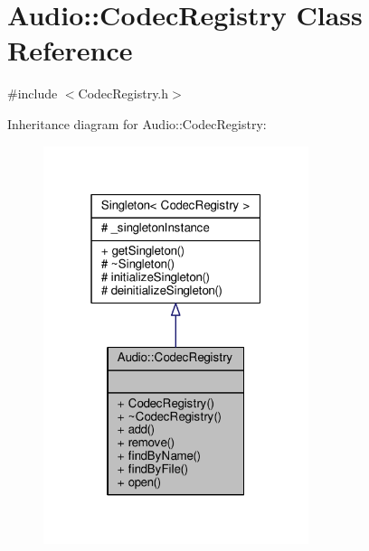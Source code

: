 \hypertarget{classAudio_1_1CodecRegistry}{}\section{Audio\+:\+:Codec\+Registry Class Reference}
\label{classAudio_1_1CodecRegistry}


{\ttfamily \#include $<$Codec\+Registry.\+h$>$}



Inheritance diagram for Audio\+:\+:Codec\+Registry\+:
\nopagebreak
\begin{figure}[H]
\begin{center}
\leavevmode
\includegraphics[width=220pt]{d7/d7b/classAudio_1_1CodecRegistry__inherit__graph}
\end{center}
\end{figure}


